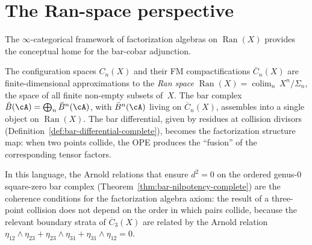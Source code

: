 \section{The Ran-space perspective}
\label{sec:ran-space-perspective}

The $\infty$-categorical framework of factorization
algebras on $\operatorname{Ran}(X)$ provides the conceptual home for
the bar-cobar adjunction.

\begin{remark}\label{rem:config-to-ran}
The configuration spaces $C_n(X)$ and their FM compactifications
$\overline{C}_n(X)$ are finite-dimensional approximations to the
\emph{Ran space} $\operatorname{Ran}(X) = \operatorname{colim}_n\,
X^n / \Sigma_n$, the space of all finite non-empty subsets of~$X$.
The bar complex $\bar{B}(\cA) = \bigoplus_n \bar{B}^n(\cA)$, with
$\bar{B}^n(\cA)$ living on $\overline{C}_n(X)$, assembles into a
single object on $\operatorname{Ran}(X)$. The bar differential,
given by residues at collision divisors
(Definition~\ref{def:bar-differential-complete}), becomes the
factorization structure map: when two points collide, the OPE
produces the ``fusion'' of the corresponding tensor factors.

In this language, the Arnold relations that ensure $d^2 = 0$ on the
ordered genus-$0$ square-zero bar complex
(Theorem~\ref{thm:bar-nilpotency-complete}) are the coherence conditions
for the factorization algebra axiom: the result of a three-point
collision does not depend on the order in which pairs collide,
because the relevant boundary strata of $\overline{C}_3(X)$ are
related by the Arnold relation
$\eta_{12} \wedge \eta_{23} + \eta_{23} \wedge \eta_{31}
+ \eta_{31} \wedge \eta_{12} = 0$.
\end{remark}

